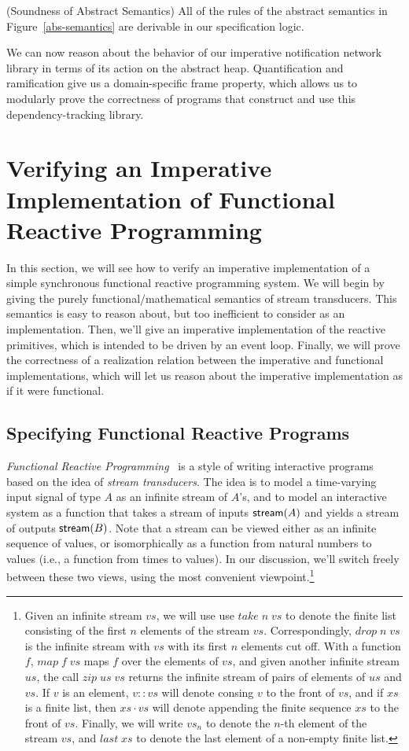 \documentclass[preprint,natbib]{sigplanconf}
\begin{document}
\begin{prop}{(Soundness of Abstract Semantics)}
All of the rules of the abstract semantics in Figure~\ref{abs-semantics} are
derivable in our specification logic. 
\end{prop}

We can now reason about the behavior of our imperative notification
network library in terms of its action on the abstract
heap. Quantification and ramification give us a domain-specific frame
property, which allows us to modularly prove the correctness of
programs that construct and use this dependency-tracking library.

\section{Verifying an Imperative Implementation of Functional Reactive Programming}

In this section, we will see how to verify an imperative
implementation of a simple synchronous functional reactive programming
system. We will begin by giving the purely functional/mathematical
semantics of stream transducers. This semantics is easy to reason
about, but too inefficient to consider as an implementation. Then,
we'll give an imperative implementation of the reactive primitives,
which is intended to be driven by an event loop. Finally, we will 
prove the correctness of a realization relation between the
imperative and functional implementations, which will let us reason
about the imperative implementation as if it were functional. 

\subsection{Specifying Functional Reactive Programs}

\emph{Functional Reactive Programming}~\cite{frp} is a style of
writing interactive programs based on the idea of \emph{stream
  transducers}.  The idea is to model a time-varying input signal of
type $A$ as an infinite stream of $A$'s, and to model an interactive
system as a function that takes a stream of inputs $\mbox{\textsf{{stream}}}({A})$ and
yields a stream of outputs $\mbox{\textsf{{stream}}}({B})$. Note that a stream can be
viewed either as an infinite sequence of values, or isomorphically as
a function from natural numbers to values (i.e., a function from times
to values). In our discussion, we'll switch freely between these two
views, using the most convenient viewpoint.\footnote{Given an infinite stream $vs$, we will use use $take\;n\;vs$ to denote
the finite list consisting of the first $n$ elements of the stream
$vs$. Correspondingly, $drop\;n\;vs$ is the infinite stream with $vs$
with its first $n$ elements cut off. With a function $f$, $map\;f\;vs$
maps $f$ over the elements of $vs$, and given another infinite stream
$us$, the call $zip\;us\;vs$ returns the infinite stream of pairs of
elements of $us$ and $vs$. If $v$ is an element, $v :: vs$ will 
denote consing $v$ to the front of $vs$, and if $xs$ is a finite list, then
$xs \cdot vs$ will denote appending the finite sequence $xs$ to the
front of $vs$. Finally, we will write $vs_n$ to denote the $n$-th element
of the stream $vs$, and $\mathit{last}\;xs$ to denote the last element of
a non-empty finite list.}
\end{document}
